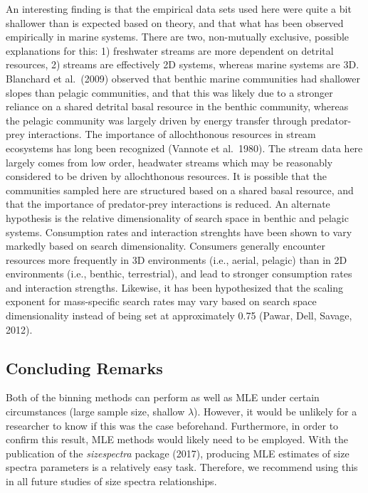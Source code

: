 \documentclass[
]{article}
\begin{document}
An interesting finding is that the empirical data sets used here were
quite a bit shallower than is expected based on theory, and that what
has been observed empirically in marine systems. There are two,
non-mutually exclusive, possible explanations for this: 1) freshwater
streams are more dependent on detrital resources, 2) streams are
effectively 2D systems, whereas marine systems are 3D. Blanchard et
al.~(2009) observed that benthic marine communities had shallower slopes
than pelagic communities, and that this was likely due to a stronger
reliance on a shared detrital basal resource in the benthic community,
whereas the pelagic community was largely driven by energy transfer
through predator-prey interactions. The importance of allochthonous
resources in stream ecosystems has long been recognized (Vannote et
al.~1980). The stream data here largely comes from low order, headwater
streams which may be reasonably considered to be driven by allochthonous
resources. It is possible that the communities sampled here are
structured based on a shared basal resource, and that the importance of
predator-prey interactions is reduced. An alternate hypothesis is the
relative dimensionality of search space in benthic and pelagic systems.
Consumption rates and interaction strenghts have been shown to vary
markedly based on search dimensionality. Consumers generally encounter
resources more frequently in 3D environments (i.e., aerial, pelagic)
than in 2D environments (i.e., benthic, terrestrial), and lead to
stronger consumption rates and interaction strengths. Likewise, it has
been hypothesized that the scaling exponent for mass-specific search
rates may vary based on search space dimensionality instead of being set
at approximately 0.75 (Pawar, Dell, Savage, 2012).

\hypertarget{concluding-remarks}{%
\subsection{Concluding Remarks}\label{concluding-remarks}}

Both of the binning methods can perform as well as MLE under certain
circumstances (large sample size, shallow \(\lambda\)). However, it
would be unlikely for a researcher to know if this was the case
beforehand. Furthermore, in order to confirm this result, MLE methods
would likely need to be employed. With the publication of the
\emph{sizespectra} package (2017), producing MLE estimates of size
spectra parameters is a relatively easy task. Therefore, we recommend
using this in all future studies of size spectra relationships.
\end{document}
